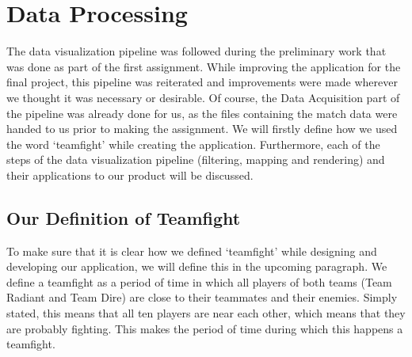 \documentclass[11pt,twoside,a4paper]{article}
\begin{document}
\section{Data Processing}
\label{sec:dataproc}
The data visualization pipeline was followed during the preliminary work that was done as part of the first assignment. While improving the application for the final project, this pipeline was reiterated and improvements were made wherever we thought it was necessary or desirable. Of course, the Data Acquisition part of the pipeline was already done for us, as the files containing the match data were handed to us prior to making the assignment. We will firstly define how we used the word `teamfight' while creating the application. Furthermore, each of the steps of the data visualization pipeline (filtering, mapping and rendering) and their applications to our product will be discussed.

\subsection{Our Definition of Teamfight}
To make sure that it is clear how we defined `teamfight' while designing and developing our application, we will define this in the upcoming paragraph.
We define a teamfight as a period of time in which all players of both teams (Team Radiant and Team Dire) are close to their teammates and their enemies. Simply stated, this means that all ten players are near each other, which means that they are probably fighting. This makes the period of time during which this happens a teamfight.
\end{document}
